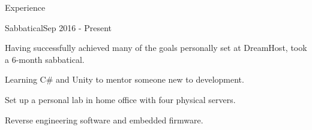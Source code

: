 \documentclass{resume} %
\begin{document}
\begin{rSection}{Experience}


\begin{rSubsection}{Sabbatical}{Sep 2016 - Present}{}{}
\item Having successfully achieved many of the goals personally set at DreamHost, took a 6-month sabbatical.
\item Learning C\# and Unity to mentor someone new to development.
\item Set up a personal lab in home office with four physical servers.
\item Reverse engineering software and embedded firmware.
\end{rSubsection}



\end{rSection}
\end{document}
